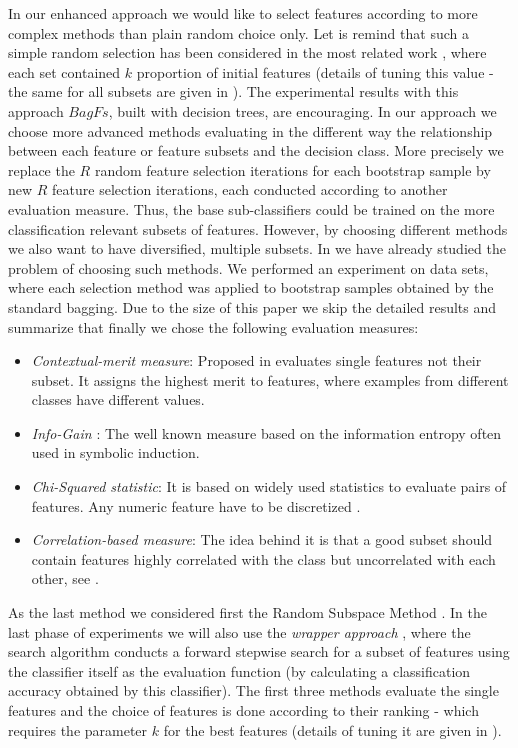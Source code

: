 \documentclass[runningheads]{llncs}
\begin{document}
In our enhanced approach we would like to select features according to more
complex methods than plain random choice only. Let is remind that such a
simple random selection has been considered in the most related work
\cite{lat1}, where each set contained $k$ proportion of initial features
(details of tuning this value - the same for all subsets are given in
\cite{lat1}). The experimental results with this approach $BagFs$, built
with decision trees, are encouraging. In our approach we choose more
advanced methods evaluating in the different way the relationship between
each feature or feature subsets and the decision class. More precisely we
replace the $R$ random feature selection iterations for each bootstrap
sample by new $R$ feature selection iterations, each conducted according to
another evaluation measure. Thus, the base sub-classifiers could be trained
on the more classification relevant subsets of features. However, by
choosing different methods we also want to have diversified, multiple
subsets. In \cite{StefKacz04,Stef04} we have already studied the problem of
choosing such methods.  We performed an experiment on data sets, where each
selection method was applied to bootstrap samples obtained by the standard
bagging. Due to the size of this paper we skip the detailed results and
summarize that finally we chose the following evaluation measures:
\begin{itemize}
\item {\em Contextual-merit measure}: Proposed in \cite{hong} evaluates single
features not their subset. It assigns the highest merit to features, where
examples from different classes have different values.
\item {\em Info-Gain }: The well known measure
based on the information entropy often used in symbolic induction.
\item {\em Chi-Squared statistic}: It is based on widely used
statistics to evaluate pairs of features. Any numeric feature have to be
discretized \cite{weka}.
\item {\em Correlation-based measure}: The idea behind it is that a
good subset should contain features highly correlated with the class but
uncorrelated with each other, see \cite{hall}.
\end{itemize}
As the last method we considered first the Random Subspace Method \cite{Ho}.
In the last phase of experiments we will also use the {\em wrapper approach}
\cite{Kohavi95}, where the search algorithm conducts a forward stepwise
search for a subset of features using the classifier itself as the
evaluation function (by calculating a classification accuracy obtained by
this classifier). The first three methods evaluate the single features and
the choice of features is done according to their ranking - which requires
the parameter $k$ for the best features (details of tuning it
are given in \cite{StefKacz04}). %
\end{document}
